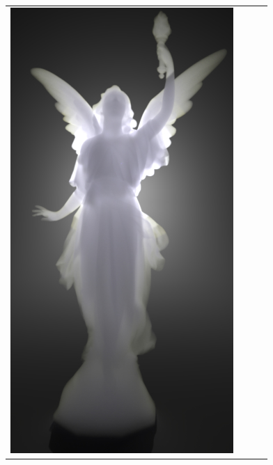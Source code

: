 \begin{figure}
    \centering
    \setlength{\resLen}{0.8in}
    \setlength{\raiseLen}{0.9in}
    \addtolength{\tabcolsep}{-3.5pt}
    \small
    \begin{tabular}{cccc}
        \includegraphics[width=\resLen]{images/lucy/color.jpg} &

\end{tabular}
\end{figure}
